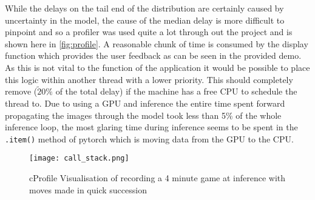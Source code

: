 \FloatBarrier
While the delays on the tail end of the distribution are certainly caused by uncertainty in the model, the cause of the median delay is more difficult to 
pinpoint and so a profiler was used quite a lot through out the project and is shown here in \autoref{fig:profile}.  A reasonable chunk of time is consumed 
by the display function which provides the user feedback as can be seen in the provided demo.  As this is not vital to the function of the application it would 
be possible to place this logic within another thread with a lower priority.  This should completely remove ($\tilde20\%$ of the total delay) if the machine
has a free CPU to schedule the thread to.  Due to using a GPU and inference the entire time spent forward propagating the images through the model took less than 
5\% of the whole inference loop, the most glaring time during inference seems to be spent in the \verb|.item()| method of pytorch which is moving data from the GPU to 
the CPU. 

\begin{figure}[h]
    \centering
    \texttt{[image: call\_stack.png]}
    \caption{cProfile Visualisation of recording a 4 minute game at inference with moves made in quick succession}
    \label{fig:profile}
\end{figure}